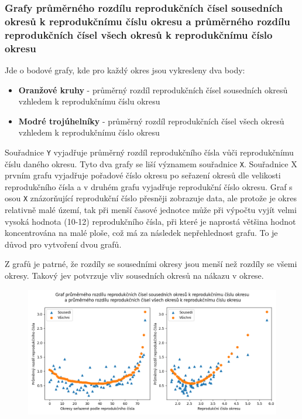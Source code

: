 \documentclass[11pt,a4paper,titlepage]{article}
\begin{document}
\newpage
\subsubsection{Grafy průměrného rozdílu reprodukčních čísel sousedních okresů k reprodukčnímu číslu okresu a průměrného rozdílu reprodukčních čísel všech okresů k reprodukčnímu číslo okresu}\label{dotazb_graf1}
Jde o bodové grafy, kde pro každý okres jsou vykresleny dva body:
\begin{itemize}
    \item \textbf{Oranžové kruhy} - průměrný rozdíl reprodukčních čísel sousedních okresů vzhledem k reprodukčnímu číslu okresu
    \item \textbf{Modré trojúhelníky} - průměrný rozdíl reprodukčních čísel všech okresů vzhledem k reprodukčnímu číslo okresu
\end{itemize}
Souřadnice \texttt{Y} vyjadřuje průměrný rozdíl reprodukčního čísla vůči reprodukčnímu číslu daného okresu. Tyto dva grafy se liší významem souřadnice \texttt{X}. Souřadnice X prvním grafu vyjadřuje pořadové číslo okresu po seřazení okresů dle velikosti reprodukčního čísla a v druhém grafu vyjadřuje reprodukční číslo okresu. Graf s osou \texttt{X} znázorňující reprodukční číslo přesněji zobrazuje data, ale protože je okres relativně malé území, tak při menší časové jednotce může při výpočtu vyjít velmi vysoká hodnota (10-12) reprodukčního čísla, při které je naprostá většina hodnot koncentrována na malé ploše, což má za následek nepřehlednost grafu. To je důvod pro vytvoření dvou grafů.

Z grafů je patrné, že rozdíly se sousedními okresy jsou menší než rozdíly se všemi okresy. Takový jev potvrzuje vliv sousedních okresů na nákazu v okrese.

\begin{figure}[h]
    \centering
    \includegraphics[width=\textwidth]{img/graf_okresy01.png}
    \label{fig:external_country}
\end{figure}
\end{document}
